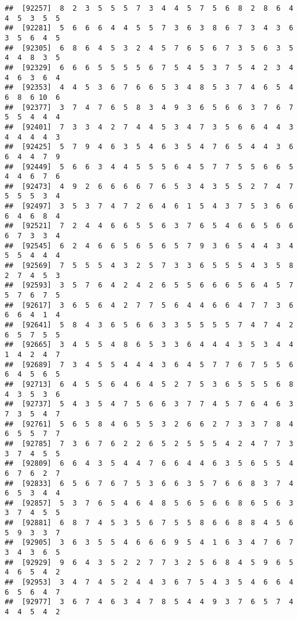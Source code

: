\documentclass[
]{book}
\begin{document}
\begin{verbatim}
##  [92257]  8  2  3  5  5  5  7  3  4  4  5  7  5  6  8  2  8  6  4  4  5  3  5  5
##  [92281]  5  6  6  6  4  4  5  5  7  3  6  3  8  6  7  3  4  3  6  3  5  6  4  5
##  [92305]  6  8  6  4  5  3  2  4  5  7  6  5  6  7  3  5  6  3  5  4  4  8  3  5
##  [92329]  6  6  6  5  5  5  5  6  7  5  4  5  3  7  5  4  2  3  4  4  6  3  6  4
##  [92353]  4  4  5  3  6  7  6  6  5  3  4  8  5  3  7  4  6  5  4  6  8  6 10  6
##  [92377]  3  7  4  7  6  5  8  3  4  9  3  6  5  6  6  3  7  6  7  5  5  4  4  4
##  [92401]  7  3  3  4  2  7  4  4  5  3  4  7  3  5  6  6  4  4  3  4  4  4  4  3
##  [92425]  5  7  9  4  6  3  5  4  6  3  5  4  7  6  5  4  4  3  6  6  4  4  7  9
##  [92449]  5  6  6  3  4  4  5  5  5  6  4  5  7  7  5  5  6  6  5  4  4  6  7  6
##  [92473]  4  9  2  6  6  6  6  7  6  5  3  4  3  5  5  2  7  4  7  5  5  5  3  4
##  [92497]  3  5  3  7  4  7  2  6  4  6  1  5  4  3  7  5  3  6  6  6  4  6  8  4
##  [92521]  7  2  4  4  6  6  5  5  6  3  7  6  5  4  6  6  5  6  6  6  7  3  3  4
##  [92545]  6  2  4  6  6  5  6  5  6  5  7  9  3  6  5  4  4  3  4  5  5  4  4  4
##  [92569]  7  5  5  5  4  3  2  5  7  3  3  6  5  5  5  4  3  5  8  2  7  4  5  3
##  [92593]  3  5  7  6  4  2  4  2  6  5  5  6  6  6  5  6  4  5  7  5  7  6  7  5
##  [92617]  3  6  5  6  4  2  7  7  5  6  4  4  6  6  4  7  7  3  6  6  6  4  1  4
##  [92641]  5  8  4  3  6  5  6  6  3  3  5  5  5  5  7  4  7  4  2  6  5  7  5  5
##  [92665]  3  4  5  5  4  8  6  5  3  3  6  4  4  4  3  5  3  4  4  1  4  2  4  7
##  [92689]  7  3  4  5  5  4  4  4  3  6  4  5  7  7  6  7  5  5  6  6  4  5  6  5
##  [92713]  6  4  5  5  6  4  6  4  5  2  7  5  3  6  5  5  5  6  8  4  3  5  3  6
##  [92737]  5  4  3  5  4  7  5  6  6  3  7  7  4  5  7  6  4  6  3  7  3  5  4  7
##  [92761]  5  6  5  8  4  6  5  5  3  2  6  6  2  7  3  3  7  8  4  6  5  5  7  7
##  [92785]  7  3  6  7  6  2  2  6  5  2  5  5  5  4  2  4  7  7  3  3  7  4  5  5
##  [92809]  6  6  4  3  5  4  4  7  6  6  4  4  6  3  5  6  5  5  4  6  7  6  2  7
##  [92833]  6  5  6  7  6  7  5  3  6  6  3  5  7  6  6  8  3  7  4  6  5  3  4  4
##  [92857]  5  3  7  6  5  4  6  4  8  5  6  5  6  6  8  6  5  6  3  3  7  4  5  5
##  [92881]  6  8  7  4  5  3  5  6  7  5  5  8  6  6  8  8  4  5  6  5  9  3  3  7
##  [92905]  3  6  3  5  5  4  6  6  6  9  5  4  1  6  3  4  7  6  7  3  4  3  6  5
##  [92929]  9  6  4  3  5  2  2  7  7  3  2  5  6  8  4  5  9  6  5  4  6  5  4  2
##  [92953]  3  4  7  4  5  2  4  4  3  6  7  5  4  3  5  4  6  6  4  6  5  6  4  7
##  [92977]  3  6  7  4  6  3  4  7  8  5  4  4  9  3  7  6  5  7  4  4  4  5  4  2

\end{verbatim}
\end{document}
